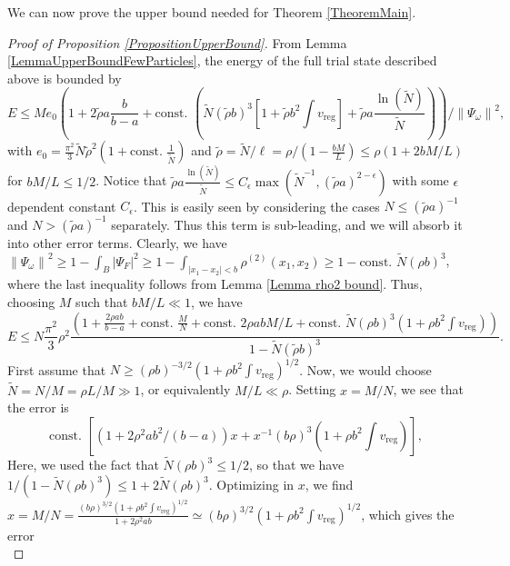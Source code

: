 \documentclass[a4paper,11pt]{article}
\newcommand{\norm}[1]{\left\lVert #1 \right\rVert}
\newcommand{\abs}[1]{\left\lvert #1 \right\rvert}
\numberwithin{equation}{section}
\begin{document}
	We can now prove the upper bound needed for Theorem \ref{TheoremMain}. 
	\begin{proof}[Proof of Proposition \ref{PropositionUpperBound}]
		From Lemma \ref{LemmaUpperBoundFewParticles}, the energy of the full trial state described above is bounded by \begin{equation}\label{EqUpperBoundSmallN}
			E\leq M e_0\left(1+2\tilde{\rho} a\frac{b}{b-a} + \text{const. } \left(\tilde{N} (\tilde{\rho}b)^3\left[1+\tilde{\rho} b^2\int v_{\text{reg}}\right]+\tilde{\rho} a \frac{\ln(\tilde{N})}{\tilde{N}}\right)\right)/\norm{\Psi_\omega}^2,
		\end{equation}
		with $ e_0=\frac{\pi^2}{3}\tilde{N}\tilde{\rho}^2(1+\text{const. }\frac{1}{\tilde{N}}) $ and $ \tilde{\rho}=\tilde{N}/\ell=\rho/(1-\frac{bM}{L})\leq \rho(1+2bM/L) $ for $ bM/L\leq 1/2 $. Notice that $\tilde{\rho} a \frac{\ln(\tilde{N})}{\tilde{N}}\leq  C_\epsilon\max (\tilde{N}^{-1},(\tilde{\rho} a)^{2-\epsilon} )$ with some $\epsilon$ dependent constant $C_\epsilon$. This is easily seen by considering the cases $N\leq(\tilde\rho a)^{-1}$ and $N>(\tilde\rho a)^{-1}$ separately. Thus this term is sub-leading, and we will absorb it into other error terms.
		Clearly, we have $ \norm{\Psi_\omega}^2\geq 1-\int_B\abs{\Psi_F}^2\geq 1-\int_{\abs{x_1-x_2}<b}\rho^{(2)}(x_1,x_2)\geq 1-\text{const. }\tilde{N}(\rho b)^3 $, where the last inequality follows from Lemma \ref{Lemma rho2 bound}.
		Thus, choosing $ M $ such that $ bM/L\ll 1 $, we have \begin{equation}
			E\leq N\frac{\pi^2}{3}\rho^2\frac{\left(1+\frac{2\rho ab}{b-a}+\text{const. }\frac{M}{N}+\text{const. }2\rho abM/L+\text{const. }\tilde{N}(\rho b)^3\left(1+\rho b^2\int v_{\text{reg}}\right)\right)}{1-\tilde{N}(\tilde{\rho} b)^3}.
		\end{equation}
		First assume that $ N\geq (\rho b)^{-3/2}\left(1+\rho b^2\int v_{\text{reg}}\right)^{1/2} $. Now, we would choose $ \tilde{N}=N/M=\rho L/M\gg 1 $, or equivalently $ M/L\ll \rho $. Setting $ x=M/N $, we see that the error is \begin{equation}
			\text{const. }\left[(1+2\rho^2 ab^2/(b-a))x+x^{-1}(b\rho)^3\left(1+\rho b^2\int v_{\text{reg}}\right)\right],
		\end{equation}
		Here, we used the fact that $ \tilde{N}(\rho b)^3\leq 1/2 $, so that we have\\ $ 1/(1-\tilde{N}(\rho b)^3)\leq 1+2\tilde{N}(\rho b)^3 $.
		Optimizing in $ x $, we find $ x=M/N=\frac{(b\rho)^{3/2}\left(1+\rho b^2\int v_{\text{reg}}\right)^{1/2}}{1+2\rho^2 a b}\simeq(b\rho)^{3/2}\left(1+\rho b^2\int v_{\text{reg}}\right)^{1/2} $, which gives the error \begin{equation}

\end{equation}
\end{proof}
\end{document}
